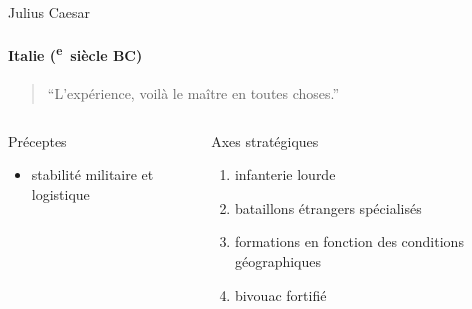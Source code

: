 \documentclass[utf8]{beamer}
\newcommand{\cRM}[1]{\MakeUppercase{\romannumeral #1}}  %
\newcommand{\siecle}[1]{\cRM{#1}\textsuperscript{e}~siècle}
\begin{document}
\begin{frame}{Julius Caesar}
\framesubtitle{Italie (\siecle{1} BC)}
\begin{quote}“L’expérience, voilà le maître en toutes choses.”\end{quote}
\vfill
\begin{columns}[t]
\begin{column}{0.5\linewidth}
Préceptes
\begin{itemize}
\item stabilité militaire et logistique
\end{itemize}
\end{column}
\begin{column}{0.5\linewidth}
Axes stratégiques
\begin{enumerate}
\item infanterie lourde
\item bataillons étrangers spécialisés
\item formations en fonction des conditions géographiques
\item bivouac fortifié
\end{enumerate}
\end{column}
\end{columns}
\end{frame}
\end{document}
